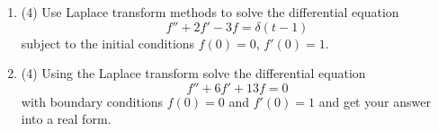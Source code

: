\documentclass[12pt]{article}
\begin{document}
\newpage


\begin{enumerate}

\item (4) Use Laplace transform methods to solve the differential equation
\begin{equation}
f'' + 2 f' - 3 f = \delta(t-1)
\end{equation}
subject to the initial conditions $f(0) = 0$, $f'(0) = 1$. 

\item (4)
Using the Laplace transform solve the differential equation
\begin{equation}
f''+6f'+13f=0
\end{equation}
with boundary conditions $f(0)=0$ and $f'(0)=1$ and get your answer into a real form. 


\end{enumerate}

\vfill
\end{document}
